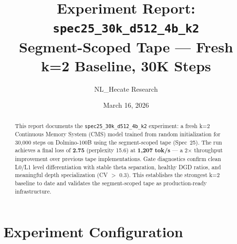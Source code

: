 \documentclass[11pt,a4paper]{article}
\title{Experiment Report: \texttt{spec25\_30k\_d512\_4b\_k2}\\[0.3em]
\large Segment-Scoped Tape --- Fresh k=2 Baseline, 30K Steps}
\author{NL\_Hecate Research}
\date{March 16, 2026}
\begin{document}
\maketitle

\begin{abstract}
This report documents the \texttt{spec25\_30k\_d512\_4b\_k2} experiment: a fresh k=2
Continuous Memory System (CMS) model trained from random initialization for 30,000 steps
on Dolmino-100B using the segment-scoped tape (Spec~25). The run achieves a final loss of
\textbf{2.75} (perplexity 15.6) at \textbf{1,207 tok/s} --- a 2$\times$ throughput improvement
over previous tape implementations. Gate diagnostics confirm clean L0/L1 level differentiation
with stable theta separation, healthy DGD ratios, and meaningful depth specialization (CV $>$ 0.3).
This establishes the strongest k=2 baseline to date and validates the segment-scoped tape as
production-ready infrastructure.
\end{abstract}

\tableofcontents
\newpage

\section{Experiment Configuration}
\end{document}
